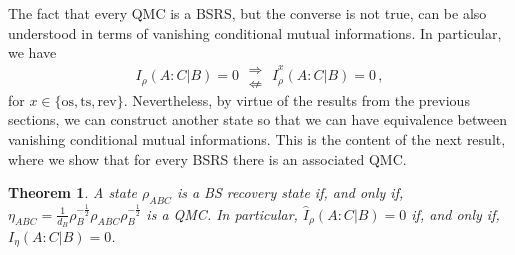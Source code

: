 \documentclass[11pt]{article}
\theoremstyle{newdefinition}
\theoremstyle{newplain}
\newtheorem{theorem}[definition]{Theorem}
\theoremstyle{myplain}
\DeclareMathOperator{\1}{\mathds{1}}
\begin{document}
The fact that every QMC is a BSRS, but the converse is not true, can be also understood in terms of vanishing conditional mutual informations. In particular, we have 
\begin{equation}
    I_{\rho}(A:C|B) = 0 \; \begin{array}{c}
        \Rightarrow   \\
         \nLeftarrow 
    \end{array} \;  \widehat{I}^x_{\rho}(A:C|B) = 0 \, ,
\end{equation}
for $x \in \{ \text{os}, \text{ts}, \text{rev}\} $. Nevertheless, by virtue of the results from the previous sections, we can construct another state so that we can have equivalence between vanishing conditional mutual informations. This is the content of the next result, where we show that for every BSRS there is an associated  QMC. 
    \begin{theorem}\label{thm:equiv_BSCMIzero_CMIzero}
    A state $\rho_{ABC}$ is a BS recovery state if, and only if, $\eta_{ABC}=\frac{1}{d_B} \rho_B^{-\frac{1}{2}}\rho_{ABC}\rho_B^{-\frac{1}{2}}$ is a QMC. In particular, $\widehat{I}_{\rho}(A:C\vert B)=0$ if, and only if, $I_{\eta}(A:C\vert B)=0$.
\end{theorem}
\end{document}
